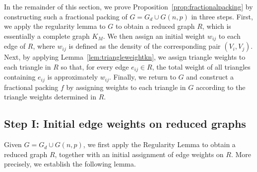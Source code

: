 \documentclass[11pt,reqno]{amsart}
\theoremstyle{definition}
\theoremstyle{remark}
\begin{document}
In the remainder of this section, we prove Proposition~\ref{prop:fractionalpacking} by constructing such a fractional packing of $G=G_d\cup G(n,p)$ in three steps. First, we apply the regularity lemma to $G$ to obtain a reduced graph $R$, which is essentially a complete graph $K_M$. We then assign an initial weight $w_{ij}$ to each edge of $R$, where $w_{ij}$ is defined as the density of the corresponding pair $(V_i, V_j)$. Next, by applying Lemma~\ref{lem:triangleweightkn}, we assign triangle weights to each triangle in $R$ so that, for every edge $e_{ij} \in R$, the total weight of all triangles containing $e_{ij}$ is approximately $w_{ij}$. Finally, we return to $G$ and construct a fractional packing $f$ by assigning weights to each triangle in $G$ according to the triangle weights determined in $R$.

 

\subsection{Step I: Initial edge weights on reduced graphs}

Given $G=G_d\cup G(n,p)$, we first apply the Regularity Lemma to obtain a reduced graph $R$, together with an initial assignment of edge weights on $R$. More precisely, we establish the following lemma.
\end{document}
